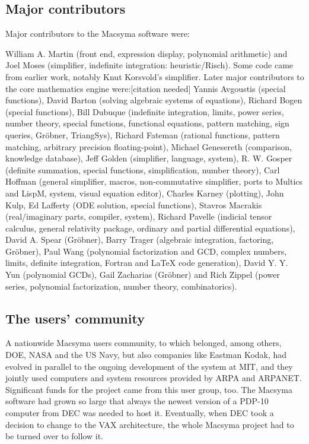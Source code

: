 \documentclass[../Maxima_Workbook.tex]{subfiles}
\begin{document}
\subsection{Major contributors}

Major contributors to the Macsyma software were:

\lz William A. Martin  (front end, expression display, polynomial arithmetic) and Joel Moses (simplifier, indefinite integration: heuristic/Risch). Some code came from earlier work, notably Knut Korsvold's simplifier. Later major contributors to the core mathematics engine were:[citation needed] Yannis Avgoustis (special functions), David Barton (solving algebraic systems of equations), Richard Bogen (special functions), Bill Dubuque (indefinite integration, limits, power series, number theory, special functions, functional equations, pattern matching, sign queries, Gröbner, TriangSys), Richard Fateman (rational functions, pattern matching, arbitrary precision floating-point), Michael Genesereth (comparison, knowledge database), Jeff Golden (simplifier, language, system), R. W. Gosper (definite summation, special functions, simplification, number theory), Carl Hoffman (general simplifier, macros, non-commutative simplifier, ports to Multics and LispM, system, visual equation editor), Charles Karney (plotting), John Kulp, Ed Lafferty (ODE solution, special functions), Stavros Macrakis (real/imaginary parts, compiler, system), Richard Pavelle (indicial tensor calculus, general relativity package, ordinary and partial differential equations), David A. Spear (Gröbner), Barry Trager (algebraic integration, factoring, Gröbner), Paul Wang (polynomial factorization and GCD, complex numbers, limits, definite integration, Fortran and LaTeX code generation), David Y. Y. Yun (polynomial GCDs), Gail Zacharias (Gröbner) and Rich Zippel (power series, polynomial factorization, number theory, combinatorics).

\subsection{The users' community}

\lz A nationwide Macsyma users community, to which belonged, among others, DOE, NASA and the US Navy, but also companies like Eastman Kodak, had evolved in parallel to the ongoing development of the system at MIT, and they jointly used computers and system resources provided by ARPA and ARPANET. Significant funds for the project came from this user group, too. The Macsyma software had grown so large that always the newest version of a PDP-10 computer from DEC was needed to host it. Eventually, when DEC took a decision to change to the VAX architecture, the whole Macsyma project had to be turned over to follow it.
\end{document}

